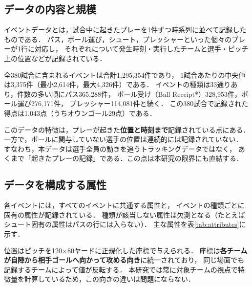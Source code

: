 \documentclass[11pt]{ujarticle} %
\begin{document}
\subsection{データの内容と規模}

イベントデータとは，試合中に起きたプレーを1件ずつ時系列に並べて記録したものである．
パス，ボール運び，シュート，プレッシャーといった個々のプレーが1行に対応し，
それぞれについて発生時刻・実行したチームと選手・ピッチ上の位置などが記録されている．

全380試合に含まれるイベントは合計1{,}295{,}354件であり，
1試合あたりの中央値は3{,}375件（最小2{,}614件，最大4{,}326件）である．
イベントの種類は33通りあり，件数の多い順にパス365{,}288件，
ボール受け（Ball Receipt*）328{,}953件，ボール運び276{,}171件，
プレッシャー114{,}081件と続く．
この380試合で記録された得点は1{,}043点（うちオウンゴール29点）である．

このデータの特徴は，プレーが起きた\textbf{位置と時刻まで}記録されている点にある．
一方で，ボールに関与していない選手の位置は連続的には記録されていない．
すなわち，本データは選手全員の動きを追うトラッキングデータではなく，
あくまで「起きたプレーの記録」である．この点は本研究の限界にも直結する．

\subsection{データを構成する属性}

各イベントには，すべてのイベントに共通する属性と，
イベントの種類ごとに固有の属性が記録されている．
種類が該当しない属性は欠測となる（たとえばシュート固有の属性はパスの行には入らない）．
主な属性を表\ref{tab:attributes}に示す．

位置はピッチを120$\times$80ヤードに正規化した座標で与えられる．
座標は\textbf{各チームが自陣から相手ゴールへ向かって攻める向き}に統一されており，
同じ場面でも記録するチームによって値が反転する．
本研究では常に対象チームの視点で特徴量を計算しているため，この向きの違いは問題にならない．
\end{document}
